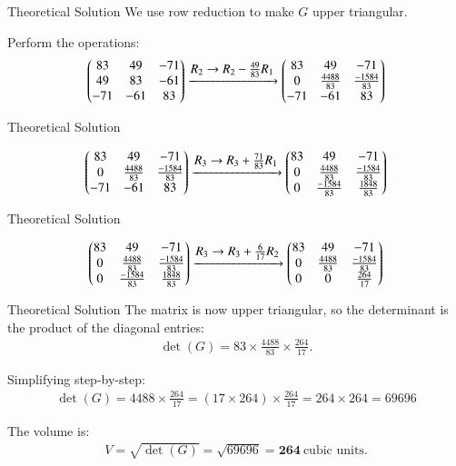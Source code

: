 \documentclass{beamer}
\begin{document}
\begin{frame}{Theoretical Solution}
We use row reduction to make \(G\) upper triangular.

Perform the operations:
\begin{align*}
\begin{pmatrix}
83 & 49 & -71 \\
49 & 83 & -61 \\
-71 & -61 & 83
\end{pmatrix}
\xrightarrow{\textstyle R_2 \to R_2 - \frac{49}{83}R_1}
\begin{pmatrix}
83 & 49 & -71 \\
0 & \tfrac{4488}{83} & \tfrac{-1584}{83} \\
-71 & -61 & 83
\end{pmatrix}
\end{align*}

\end{frame}
\begin{frame}{Theoretical Solution}

\begin{align*}
\begin{pmatrix}
83 & 49 & -71 \\
0 & \tfrac{4488}{83} & \tfrac{-1584}{83} \\
-71 & -61 & 83
\end{pmatrix}
\xrightarrow{\textstyle R_3 \to R_3 + \frac{71}{83}R_1}
\begin{pmatrix}
83 & 49 & -71 \\
0 & \tfrac{4488}{83} & \tfrac{-1584}{83} \\
0 & \tfrac{-1584}{83} & \tfrac{1848}{83}
\end{pmatrix}
\end{align*}


\end{frame}


\begin{frame}{Theoretical Solution}

\begin{align*}
\begin{pmatrix}
83 & 49 & -71 \\
0 & \tfrac{4488}{83} & \tfrac{-1584}{83} \\
0 & \tfrac{-1584}{83} & \tfrac{1848}{83}
\end{pmatrix}
\xrightarrow{\textstyle R_3 \to R_3 + \frac{6}{17}R_2}
\begin{pmatrix}
83 & 49 & -71 \\
0 & \tfrac{4488}{83} & \tfrac{-1584}{83} \\
0 & 0 & \tfrac{264}{17}
\end{pmatrix}
\end{align*}

\end{frame}

\begin{frame}{Theoretical Solution}
The matrix is now upper triangular, so the determinant is the product of the diagonal entries:
\begin{align*}
\det(G) = 83 \times \frac{4488}{83} \times \frac{264}{17}.
\end{align*}

Simplifying step-by-step:
\begin{align*}
\det(G) = 4488 \times \frac{264}{17} = (17 \times 264) \times \frac{264}{17} = 264 \times 264 = 69696
\end{align*}

The volume is:
\begin{align*}
V = \sqrt{\det(G)} = \sqrt{69696} = \mathbf{264} \ \text{cubic units.}
\end{align*}
\end{frame}
\end{document}
